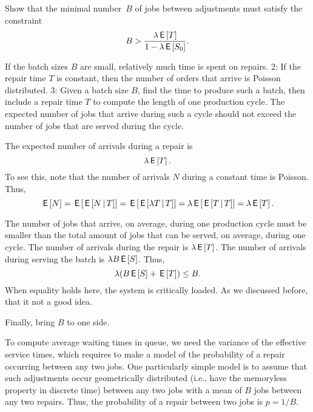 \begin{exercise} 
Show that the minimal number~$B$ of jobs between adjustments must satisfy the constraint
  \begin{equation*}
 B>\frac{\lambda \,\mathsf{E}\left[T\right]}{1-\lambda \,\mathsf{E}\left[S_0\right]}.
  \end{equation*}

\begin{hint}
 If the batch sizes $B$ are small, relatively much time is
  spent on repairs. 2: If the repair time $T$ is constant, then the
  number of orders that arrive is Poisson distributed. 3: Given a
  batch size $B$, find the time to produce such a batch, then include
  a repair time $T$ to compute the length of one production cycle. The
  expected number of jobs that arrive during such a cycle should not exceed the number of jobs that are served during the cycle.
\end{hint}
\begin{solution}
The expected number of arrivals during a repair is
\begin{equation*}
    \lambda \,\mathsf{E}\left[T\right].
  \end{equation*}
To see this, note that  the number of arrivals $N$ during a constant time is Poisson. Thus,
\begin{equation*}
  \,\mathsf{E}\left[N\right] = \,\mathsf{E}\left[ \,\mathsf{E}\left[N\,\middle|\, T\right]\right] = \,\mathsf{E}\left[ \,\mathsf{E}\left[\lambda T\,\middle|\, T\right]\right] = \lambda \,\mathsf{E}\left[\,\mathsf{E}\left[T \,\middle|\, T\right]\right] = \lambda \,\mathsf{E}\left[T\right].
\end{equation*}

The number of jobs that arrive, on average, during one
  production cycle must be smaller than the total amount of jobs that
  can be served, on average, during one cycle.   The number of arrivals during the repair is $\lambda \,\mathsf{E}\left[T\right]$. The number of arrivals during serving the batch is $\lambda B \,\mathsf{E}\left[S\right]$. Thus, 
  \begin{equation*}
    \lambda ( B \,\mathsf{E}\left[S\right] + \,\mathsf{E}\left[T\right]) \leq B.
  \end{equation*}
  When equality holds here, the system is critically loaded. As we
  discussed before, that it not a good idea.

Finally, bring $B$ to one side.
\end{solution}
\end{exercise}

To compute average waiting times in queue, we need the variance of the effective service times, which requires to make a model of the probability of a repair occurring between any two jobs. One particularly simple model is to assume that such adjustments occur geometrically distributed  (i.e., have the memoryless property in discrete time) between any two jobs with a mean of $B$ jobs between any two repairs.  Thus, the probability of a repair between two jobs is $p=1/B$. 

